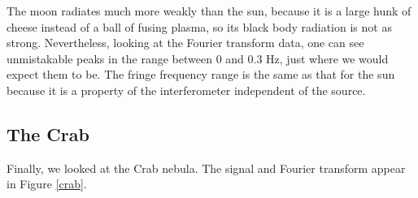 \documentclass[11pt]{article}
\begin{document}
The moon radiates much more weakly than the sun, because it is a large hunk of cheese instead of a ball of fusing plasma, so its black body radiation is not as strong. Nevertheless, looking at the Fourier transform data, one can see unmistakable peaks in the range between 0 and 0.3 Hz, just where we would expect them to be. The fringe frequency range is the same as that for the sun because it is a property of the interferometer independent of the source. 


\subsection{The Crab}

Finally, we looked at the Crab nebula. The signal and Fourier transform appear in Figure \ref{crab}.
\end{document}
